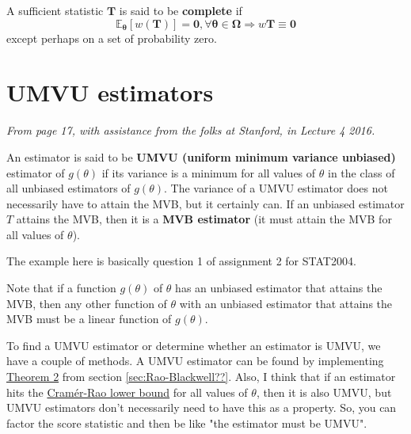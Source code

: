 \begin{definition}\label{defn:complete}
    A sufficient statistic \(\bm{T}\) is said to be \textbf{complete} if 
    \begin{equation}\label{eq:complete premise}
        \mathbb{E}_{\bm{\theta}}[w(\bm{T})] = \bm{0}, \forall \bm{\theta} \in \bm{\Omega} \Rightarrow w{\bm{T}} \equiv \bm{0}
    \end{equation}
    except perhaps on a set of probability zero. 
\end{definition}



\section{UMVU estimators}\label{sec:UMVU ests}

\textit{From page 17, with assistance from the folks at Stanford, \autocite{stanford} in Lecture 4 2016.}

An estimator is said to be \textbf{UMVU (uniform minimum variance unbiased)} estimator of \(g(\theta)\) if its variance is a minimum for all values of \(\theta\) in the class of all unbiased estimators of \(g(\theta)\). 
The variance of a UMVU estimator does not necessarily have to attain the MVB, but it certainly can.
If an unbiased estimator \(T\) attains the MVB, then it is a \textbf{MVB estimator} (it must attain the MVB for all values of \(\theta\)). 

\begin{example}
    The example here is basically question 1 of assignment 2 for STAT2004.
\end{example}

Note that if a function \(g(\theta)\) of \(\theta\) has an unbiased estimator that attains the MVB, then any other function of \(\theta\) with an unbiased estimator that attains the MVB must be a linear function of \(g(\theta)\). 

\bigskip

To find a UMVU estimator or determine whether an estimator is UMVU, we have a couple of methods. 
A UMVU estimator can be found by implementing \hyperref[thm:thm 2 UMVU]{Theorem 2} from section \ref{sec:Rao-Blackwell??}. 
Also, I think that if an estimator hits the  \hyperref[defn:cramer]{Cram\'{e}r-Rao lower bound} for all values of \(\theta\), then it is also UMVU, but UMVU estimators don't necessarily need to have this as a property. 
So, you can factor the score statistic and then be like "the estimator must be UMVU". 

